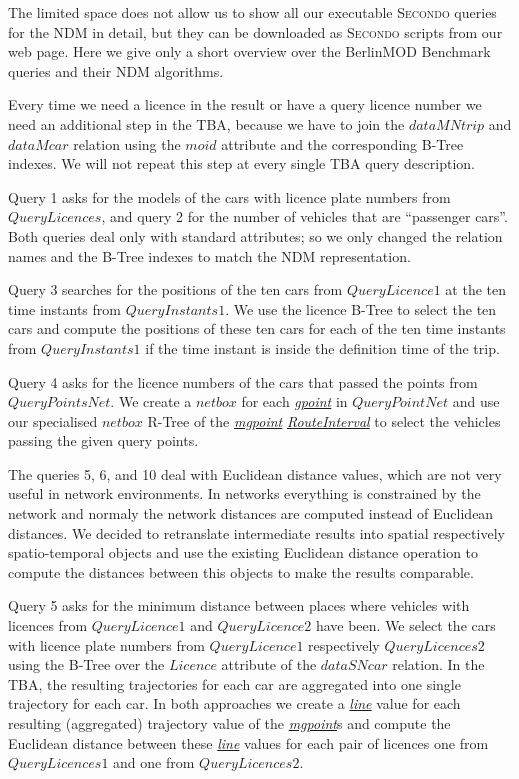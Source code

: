 \documentclass[a4paper]{article}
\newcommand{\secondo}{\textsc{Secondo}}
\newcommand{\bmodb} {BerlinMOD Benchmark}
\newcommand{\dt}[1]{\textsl{\underline{#1}}}
\begin{document}
The limited space does not allow us to show all our executable \secondo{} queries
for the NDM in detail, but they can be downloaded as \secondo{} scripts
from our web page. Here we give only a short overview over the \bmodb{} queries
and their NDM algorithms.

Every time we need a licence in the result or have a query licence number we need
an additional step in the TBA, because we have to join the $dataMNtrip$ and $dataMcar$
relation using the $moid$ attribute and the corresponding B-Tree indexes.
We will not repeat this step at every single TBA query description.

Query 1 asks for the models of the cars with licence plate numbers from $QueryLicences$,
and query 2 for the number of vehicles that are ``passenger cars''. Both queries
deal only with standard attributes; so we only changed the relation names and the
B-Tree indexes to match the NDM representation.

Query 3 searches for the positions of the ten cars from $QueryLicence1$ at the
ten time instants from $QueryInstants1$. We use the licence B-Tree to select the
ten cars and compute the positions of these ten cars for each of the ten time
instants from $QueryInstants1$ if the time instant is inside the definition time
of the trip.

Query 4 asks for the licence numbers of the cars that passed the points
from $QueryPointsNet$. We create a $netbox$ for each \dt{gpoint} in $QueryPointNet$
and use our specialised $netbox$ R-Tree of the \dt{mgpoint} \dt{RouteInterval} to
select the vehicles passing the given query points.

The queries 5, 6, and 10 deal with Euclidean distance values, which are not very
useful in network environments. In networks everything is constrained by the
network and normaly the network distances are computed instead of Euclidean
distances. We decided to retranslate intermediate results
into spatial respectively spatio-temporal objects and use the existing
Euclidean distance operation to compute the distances between this objects to make
the results comparable.

Query 5 asks for the minimum distance between places where vehicles with
licences from $QueryLicence1$ and $QueryLicence2$ have been. We select the cars
with licence plate numbers from $QueryLicence1$ respectively $QueryLicences2$ using the
B-Tree over the $Licence$ attribute of the $dataSNcar$ relation. In the TBA, the
resulting trajectories for each car are aggregated into one single trajectory
for each car. In both approaches we create a \dt{line} value for each resulting
(aggregated) trajectory value of the \dt{mgpoint}s and compute the Euclidean distance
between these \dt{line} values for each pair of licences one from $QueryLicences1$ and one
from $QueryLicences2$.
\end{document}

